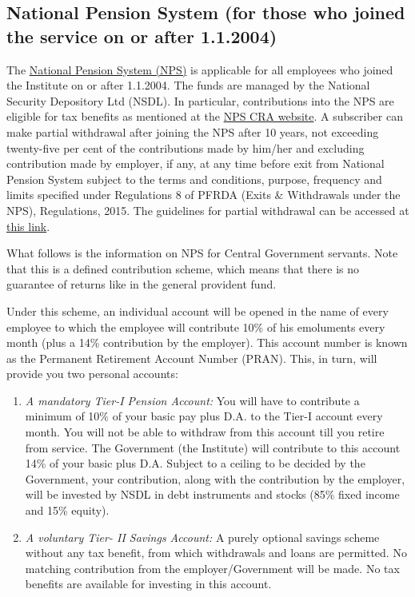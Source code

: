 \documentclass[
  10pt,
  a5paper,
  10pt,
  openany]{amsbook}
\providecommand{\tightlist}{%
  \setlength{\itemsep}{0pt}\setlength{\parskip}{0pt}}
\begin{document}
\subsection{National Pension System (for those who joined the service on
or after 1.1.2004)}\label{sec:npsnote}

The
\href{https://enps.nsdl.com/eNPS/NationalPensionSystem.html}{National
Pension System (NPS)} is applicable for all employees who joined the
Institute on or after 1.1.2004. The funds are managed by the National
Security Depository Ltd (NSDL). In particular, contributions into the
NPS are eligible for tax benefits as mentioned at the
\href{https://www.npscra.nsdl.co.in/tax-benefits-under-nps.php}{NPS CRA
website}. A subscriber can make partial withdrawal after joining the NPS
after 10 years, not exceeding twenty-five per cent of the contributions
made by him/her and excluding contribution made by employer, if any, at
any time before exit from National Pension System subject to the terms
and conditions, purpose, frequency and limits specified under
Regulations 8 of PFRDA (Exits \& Withdrawals under the NPS),
Regulations, 2015. The guidelines for partial withdrawal can be accessed
at
\href{https://www.npscra.nsdl.co.in/download/Annexure_PFRDA_Circular_CRA_PO_RI_Master_2016_003.pdf}{this
link}.

What follows is the information on NPS for Central Government servants.
Note that this is a defined contribution scheme, which means that there
is no guarantee of returns like in the general provident fund.

Under this scheme, an individual account will be opened in the name of
every employee to which the employee will contribute 10\% of his
emoluments every month (plus a 14\% contribution by the employer). This
account number is known as the Permanent Retirement Account Number
(PRAN). This, in turn, will provide you two personal accounts:

\begin{enumerate}
\def\labelenumi{\arabic{enumi}.}
\tightlist
\item
  \emph{A mandatory Tier-I Pension Account:} You will have to contribute
  a minimum of 10\% of your basic pay plus D.A. to the Tier-I account
  every month. You will not be able to withdraw from this account till
  you retire from service. The Government (the Institute) will
  contribute to this account 14\% of your basic plus D.A. Subject to a
  ceiling to be decided by the Government, your contribution, along with
  the contribution by the employer, will be invested by NSDL in debt
  instruments and stocks (85\% fixed income and 15\% equity).
\item
  \emph{A voluntary Tier- II Savings Account:} A purely optional savings
  scheme without any tax benefit, from which withdrawals and loans are
  permitted. No matching contribution from the employer/Government will
  be made. No tax benefits are available for investing in this account.
\end{enumerate}
\end{document}
